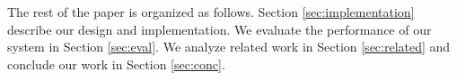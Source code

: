 
The rest of the paper is organized as follows. Section
\ref{sec:implementation} describe our design and implementation.
We evaluate the performance of our system in Section \ref{sec:eval}.
We analyze related work in Section \ref{sec:related} and conclude our
work in Section \ref{sec:conc}.

